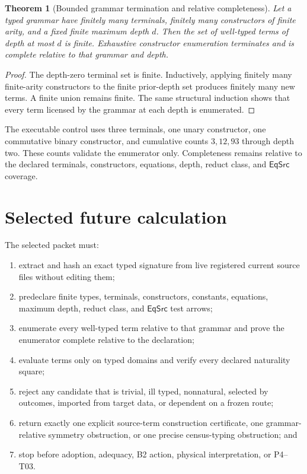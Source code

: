 \documentclass[11pt]{article}
\newtheorem{theorem}{Theorem}
\newcommand{\EqSrc}{\mathsf{EqSrc}}
\begin{document}
\begin{theorem}[Bounded grammar termination and relative completeness]
Let a typed grammar have finitely many terminals, finitely many constructors
of finite arity, and a fixed finite maximum depth \(d\).  Then the set of
well-typed terms of depth at most \(d\) is finite.  Exhaustive constructor
enumeration terminates and is complete relative to that grammar and depth.
\end{theorem}

\begin{proof}
The depth-zero terminal set is finite.  Inductively, applying finitely many
finite-arity constructors to the finite prior-depth set produces finitely many
new terms.  A finite union remains finite.  The same structural induction
shows that every term licensed by the grammar at each depth is enumerated.
\end{proof}

The executable control uses three terminals, one unary constructor, one
commutative binary constructor, and cumulative counts \(3,12,93\) through
depth two.  These counts validate the enumerator only.  Completeness remains
relative to the declared terminals, constructors, equations, depth, reduct
class, and \(\EqSrc\) coverage.

\section{Selected future calculation}

The selected packet must:
\begin{enumerate}
  \item extract and hash an exact typed signature from live registered current
  source files without editing them;
  \item predeclare finite types, terminals, constructors, constants,
  equations, maximum depth, reduct class, and \(\EqSrc\) test arrows;
  \item enumerate every well-typed term relative to that grammar and prove the
  enumerator complete relative to the declaration;
  \item evaluate terms only on typed domains and verify every declared
  naturality square;
  \item reject any candidate that is trivial, ill typed, nonnatural, selected
  by outcomes, imported from target data, or dependent on a frozen route;
  \item return exactly one explicit source-term construction certificate, one
  grammar-relative symmetry obstruction, or one precise census-typing
  obstruction; and
  \item stop before adoption, adequacy, B2 action, physical interpretation, or
  P4--T03.
\end{enumerate}
\end{document}
